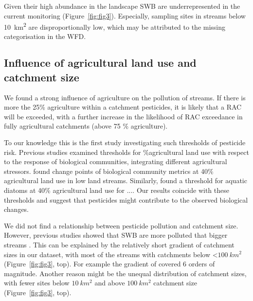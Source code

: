 \documentclass[journal=esthag,manuscript=article]{achemso}
\begin{document}
Given their high abundance in the landscape \citep{nadeau_hydrological_2007} SWB are underrepresented in the current monitoring (Figure~\ref{fig:fig3}). 
Especially, sampling sites in streams below 10~km\textsuperscript{2} are disproportionally low, which may be attributed to the missing categorisation in the WFD. 



\subsection{Influence of agricultural land use and catchment size}
We found a strong influence of agriculture on the pollution of streams.
If there is more the 25\% agriculture within a catchment pesticides, it is likely that a RAC will be exceeded, with a further increase in the likelihood of RAC exceedance in fully agricultural catchments (above 75 \% agriculture).

To our knowledge this is the first study investigating such thresholds of pesticide risk.
Previous studies examined thresholds for \%agricultural land use with respect to the response of biological communities, integrating different agricultural stressors.
\citet{feld_response_2013} found change points of biological community metrics at 40\% agricultural land use  in low land streams. 
Similarly, \citet{waite_agricultural_2014} found a threshold for aquatic diatoms at 40\% agricultural land use for ....
Our results coincide with these thresholds and suggest that pesticides might contribute to the observed biological changes. 

We did not find a relationship between pesticide pollution and catchment size.
However, previous studies showed that SWB are more polluted that bigger streams \citep{schulz_field_2004,stehle_pesticide_2015,knauer_pesticides_2016}.
This can be explained by the relatively short gradient of catchment sizes in our dataset, with most of the streams with catchments below \textless $100~km^2$ (Figure~\ref{fig:fig3}, top).
For example the gradient of \citet{schulz_field_2004} covered 6 orders of magnitude.
Another reason might be the unequal distribution of catchment sizes, with fewer sites below $10~km^2$ and above $100~km^2$ catchment size (Figure~\ref{fig:fig3}, top).
\end{document}
